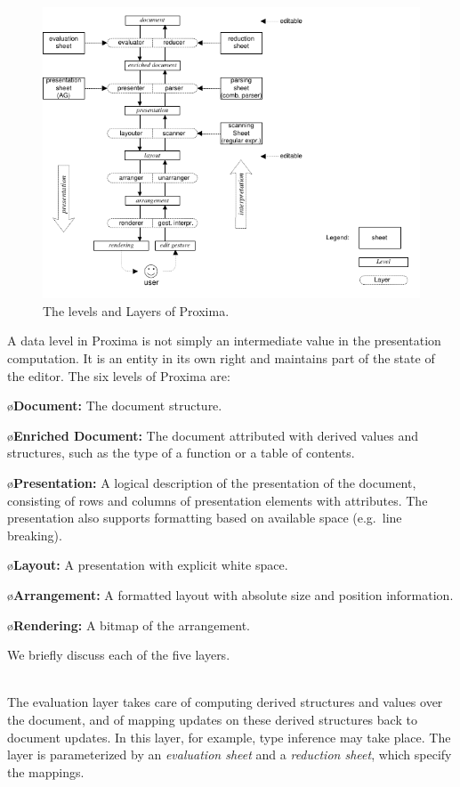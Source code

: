 \documentclass[10pt]{article}
\begin{document}
\begin{figure}
\includegraphics[width=12cm]{images/LayerOverview}
\caption{The levels and Layers of Proxima.}
\label{fig:levelsAndLayers}
\end{figure}

A data level in Proxima is not simply an intermediate value in the presentation computation. It is an entity in its own right and maintains part of the state of the editor. The six levels of Proxima are:


\bl
\o {\bf Document:} The document structure.

\o {\bf Enriched Document:} The document attributed with derived values and structures, such as the type of a function or a table of contents.

\o{\bf Presentation:} A logical description of the presentation of the document, consisting of rows and columns of presentation elements with attributes. The presentation also supports formatting based on available space (e.g.\ line breaking).

\o{\bf Layout:} A presentation with explicit white space. 

\o{\bf Arrangement:} A formatted layout with absolute size and position information.

\o{\bf Rendering:} A bitmap of the arrangement.
\el


\bc
We briefly discuss each of the five layers.

\\
The evaluation layer takes care of computing derived structures and values over the document, and of mapping updates on these derived structures back to document updates. In this layer, for example, type inference may take place. The layer is parameterized by an {\em evaluation sheet} and a {\em reduction sheet}, which specify the mappings. 
\end{document}
